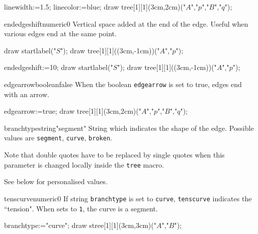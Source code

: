\documentclass[11pt,a4paper,english]{article}
\begin{document}
\begin{exemple}[lefthand ratio=0.65]
 linewidth:=1.5;
 linecolor:=blue;
 draw tree[1][1](3cm,2cm)("$A$","$p$","$B$","$q$");
\end{exemple}

\begin{mptparam}{endedgeshift}{numeric}{0}
Vertical space added at the end of the edge. Useful when various edges end at the same point.
\end{mptparam}

\begin{exemple}[lefthand ratio=0.65]
 draw startlabel("$S$");
 draw tree[1][1]((3cm,-1cm))("$A$","$p$");
\end{exemple}


\begin{exemple}[lefthand ratio=0.65]
 endedgeshift:=10;
 draw startlabel("$S$");
 draw tree[1][1]((3cm,-1cm))("$A$","$p$");
\end{exemple}

\begin{mptparam}{edgearrow}{boolean}{false}
When the boolean \verb|edgearrow| is set to true, edges end with an arrow.
\end{mptparam}

\begin{exemple}[lefthand ratio=0.65]
 edgearrow:=true;
 draw tree[1][1](3cm,2cm)("$A$","$p$","$B$","$q$");
\end{exemple}

\begin{mptparam}{branchtype}{string}{"segment"}
String which indicates the shape of the edge. Possible values are  \verb|segment|, \verb|curve|, \verb|broken|.

Note that double quotes have to be replaced by single quotes when this parameter is changed locally inside the \verb|tree| macro.


See below for personalised values.

\end{mptparam}


\begin{mptparam}{tenscurve}{numeric}{0}
 If string \verb|branchtype| is set to \verb|curve|, \verb|tenscurve| indicates the ``tension". When sets to \verb|1|, the curve is a segment.
 \end{mptparam}

\begin{exemple}[lefthand ratio=0.6]
 branchtype:="curve";
 draw stree[1][1](3cm,3cm)("$A$","$B$");
\end{exemple}
\end{document}

